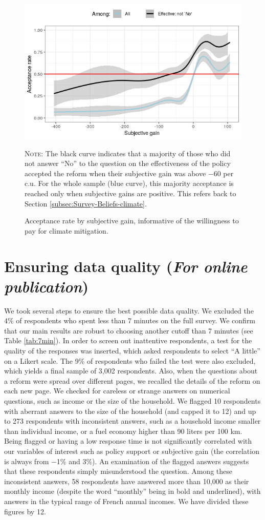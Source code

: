\documentclass[12pt]{article} %
\begin{document}
\begin{appendices}
\begin{figure}[H]
\centering
\includegraphics[width=0.7\columnwidth]{Images/WTP_Both.png}
{\footnotesize \parbox[t]{\textwidth}{\linespread{1.2}\selectfont \textsc{Note:} The black curve indicates that a majority of those who did not answer ``No'' to the question on the effectiveness of the policy accepted the reform when their subjective gain was above $-$60\euros{} per c.u. For the whole sample (blue curve), this majority acceptance is reached only when subjective gains are positive. This refers back to Section \ref{subsec:Survey-Beliefs-climate}.} \caption{Acceptance rate by subjective gain, informative of the willingness to pay for climate mitigation.\label{fig:WTP}}} %
\end{figure}

\section{Ensuring data quality (\emph{For online publication})}\label{app:speed} %

We took several steps to ensure the best possible data quality. We excluded the 4\% of respondents who spent less than 7 minutes on the full survey. We confirm that our main results are robust to choosing another cutoff than 7 minutes (see Table \ref{tab:7min}). In order to screen out inattentive respondents, a test for the quality of the responses was inserted, which asked respondents to select ``A little'' on a Likert scale. The 9\% of respondents who failed the test were also excluded, which yields a final sample of 3,002 respondents. Also, when the questions about a reform were spread over different pages, we recalled the details of the reform on each new page. We checked for careless or strange answers on numerical questions, such as income or the size of the household. We flagged 10 respondents with aberrant answers to the size of the household (and capped it to 12) and up to 273 respondents with inconsistent answers, such as a household income smaller than individual income, or a fuel economy higher than 90 liters per 100 km. Being flagged or having a low response time is not significantly correlated with our variables of interest such as policy support or subjective gain (the correlation is always from $-$1\% and 3\%). An examination of the flagged answers suggests that these respondents simply misunderstood the question. Among these inconsistent answers, 58 respondents have answered more than 10,000\euros{} as their monthly income (despite the word ``monthly'' being in bold and underlined), with answers in the typical range of French annual incomes. We have divided these figures by 12. 


\end{appendices}
\end{document}
